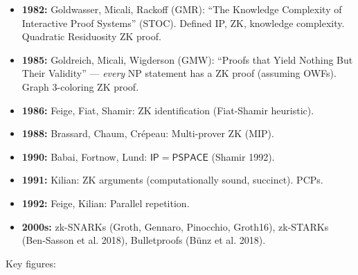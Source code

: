 \begin{itemize}
\item \textbf{1982:} Goldwasser, Micali, Rackoff (GMR): ``The Knowledge Complexity of Interactive Proof Systems'' (STOC). Defined IP, ZK, knowledge complexity. Quadratic Residuosity ZK proof.
\item \textbf{1985:} Goldreich, Micali, Wigderson (GMW): ``Proofs that Yield Nothing But Their Validity'' --- \emph{every} NP statement has a ZK proof (assuming OWFs). Graph 3-coloring ZK proof.
\item \textbf{1986:} Feige, Fiat, Shamir: ZK identification (Fiat-Shamir heuristic).
\item \textbf{1988:} Brassard, Chaum, Crépeau: Multi-prover ZK (MIP).
\item \textbf{1990:} Babai, Fortnow, Lund: $\mathsf{IP} = \mathsf{PSPACE}$ (Shamir 1992).
\item \textbf{1991:} Kilian: ZK arguments (computationally sound, succinct). PCPs.
\item \textbf{1992:} Feige, Kilian: Parallel repetition.
\item \textbf{2000s:} zk-SNARKs (Groth, Gennaro, Pinocchio, Groth16), zk-STARKs (Ben-Sasson et al. 2018), Bulletproofs (B\"unz et al. 2018).
\end{itemize}

Key figures:

